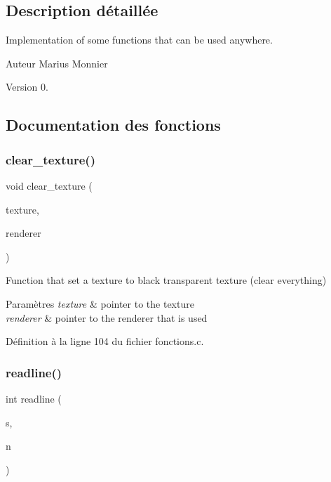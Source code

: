 \subsection{Description détaillée}
Implementation of some functions that can be used anywhere. 

\begin{DoxyAuthor}{Auteur}
Marius Monnier 
\end{DoxyAuthor}
\begin{DoxyVersion}{Version}
0. 
\end{DoxyVersion}


\subsection{Documentation des fonctions}
\mbox{\label{fonctions_8c_ab0852adabab2829b722da4fc549ac6a9}} 
\subsubsection{clear\+\_\+texture()}
{\footnotesize\ttfamily void clear\+\_\+texture (\begin{DoxyParamCaption}\item[{S\+D\+L\+\_\+\+Texture $\ast$}]{texture,  }\item[{S\+D\+L\+\_\+\+Renderer $\ast$}]{renderer }\end{DoxyParamCaption})}



Function that set a texture to black transparent texture (clear everything) 


\begin{DoxyParams}{Paramètres}
{\em texture} & pointer to the texture \\
\hline
{\em renderer} & pointer to the renderer that is used \\
\hline
\end{DoxyParams}


Définition à la ligne 104 du fichier fonctions.\+c.

\mbox{\label{fonctions_8c_afe286242e48f523265fd5fcdae3f7358}} 
\subsubsection{readline()}
{\footnotesize\ttfamily int readline (\begin{DoxyParamCaption}\item[{char $\ast$}]{s,  }\item[{int}]{n }\end{DoxyParamCaption})}




